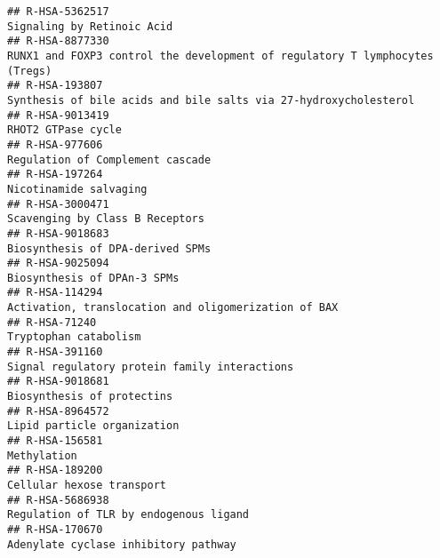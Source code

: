 \documentclass[
]{article}
\begin{document}
\begin{verbatim}
## R-HSA-5362517                                                                                                           Signaling by Retinoic Acid
## R-HSA-8877330                                                          RUNX1 and FOXP3 control the development of regulatory T lymphocytes (Tregs)
## R-HSA-193807                                                                      Synthesis of bile acids and bile salts via 27-hydroxycholesterol
## R-HSA-9013419                                                                                                                   RHOT2 GTPase cycle
## R-HSA-977606                                                                                                      Regulation of Complement cascade
## R-HSA-197264                                                                                                                Nicotinamide salvaging
## R-HSA-3000471                                                                                                      Scavenging by Class B Receptors
## R-HSA-9018683                                                                                                     Biosynthesis of DPA-derived SPMs
## R-HSA-9025094                                                                                                          Biosynthesis of DPAn-3 SPMs
## R-HSA-114294                                                                                  Activation, translocation and oligomerization of BAX
## R-HSA-71240                                                                                                                  Tryptophan catabolism
## R-HSA-391160                                                                                         Signal regulatory protein family interactions
## R-HSA-9018681                                                                                                           Biosynthesis of protectins
## R-HSA-8964572                                                                                                          Lipid particle organization
## R-HSA-156581                                                                                                                           Methylation
## R-HSA-189200                                                                                                             Cellular hexose transport
## R-HSA-5686938                                                                                               Regulation of TLR by endogenous ligand
## R-HSA-170670                                                                                                  Adenylate cyclase inhibitory pathway

\end{verbatim}
\end{document}
